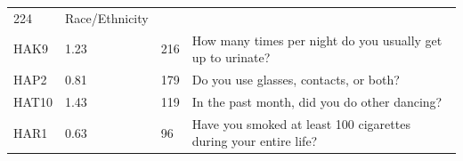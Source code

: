 \documentclass[12pt,oneside]{reedthesis}
\theoremstyle{definition}
\theoremstyle{definition}
\theoremstyle{definition}
\theoremstyle{remark}
\begin{document}
\begin{longtable}[]{@{}llll@{}}
\begin{minipage}[t]{0.12\columnwidth}
224\strut
\end{minipage} & \begin{minipage}[t]{0.33\columnwidth}\raggedright
Race/Ethnicity\strut
\end{minipage}\tabularnewline
\begin{minipage}[t]{0.21\columnwidth}\raggedright
HAK9\strut
\end{minipage} & \begin{minipage}[t]{0.23\columnwidth}\raggedright
1.23\strut
\end{minipage} & \begin{minipage}[t]{0.12\columnwidth}\raggedright
216\strut
\end{minipage} & \begin{minipage}[t]{0.33\columnwidth}\raggedright
How many times per night do you usually get up to urinate?\strut
\end{minipage}\tabularnewline
\begin{minipage}[t]{0.21\columnwidth}\raggedright
HAP2\strut
\end{minipage} & \begin{minipage}[t]{0.23\columnwidth}\raggedright
0.81\strut
\end{minipage} & \begin{minipage}[t]{0.12\columnwidth}\raggedright
179\strut
\end{minipage} & \begin{minipage}[t]{0.33\columnwidth}\raggedright
Do you use glasses, contacts, or both?\strut
\end{minipage}\tabularnewline
\begin{minipage}[t]{0.21\columnwidth}\raggedright
HAT10\strut
\end{minipage} & \begin{minipage}[t]{0.23\columnwidth}\raggedright
1.43\strut
\end{minipage} & \begin{minipage}[t]{0.12\columnwidth}\raggedright
119\strut
\end{minipage} & \begin{minipage}[t]{0.33\columnwidth}\raggedright
In the past month, did you do other dancing?\strut
\end{minipage}\tabularnewline
\begin{minipage}[t]{0.21\columnwidth}\raggedright
HAR1\strut
\end{minipage} & \begin{minipage}[t]{0.23\columnwidth}\raggedright
0.63\strut
\end{minipage} & \begin{minipage}[t]{0.12\columnwidth}\raggedright
96\strut
\end{minipage} & \begin{minipage}[t]{0.33\columnwidth}\raggedright
Have you smoked at least 100 cigarettes during your entire life?\strut
\end{minipage}\tabularnewline
\bottomrule
\end{longtable}
\end{document}
